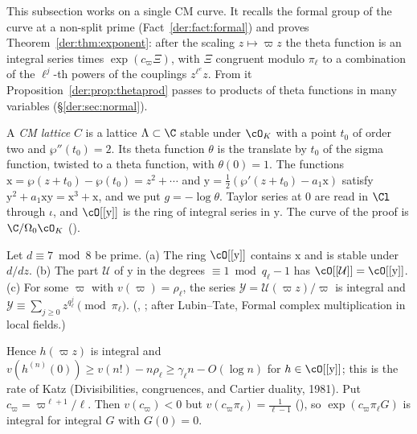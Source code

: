 This subsection works on a single CM curve. It recalls the formal group of the curve at a
non-split prime (Fact~\ref{der:fact:formal}) and proves Theorem~\ref{der:thm:exponent}: after the
scaling $z\mapsto\varpi z$ the theta function is an integral series times $\exp(c_\varpi\Xi)$, with
$\Xi$ congruent modulo $\pi_\ell$ to a combination of the $\ell^j$-th powers of the couplings
$z^{\ell^e}z$. From it Proposition~\ref{der:prop:thetaprod} passes to products of theta functions
in many variables (\S\ref{der:sec:normal}).

A \emph{CM lattice} $C$ is a lattice $\Lambda\subset\C$ stable under $\cO_K$ with a point $t_0$ of
order two and $\wp''(t_0)=2$. Its theta function $\theta$ is the translate by $t_0$ of the sigma
function, twisted to a theta function, with $\theta(0)=1$. The functions
$\mathrm x=\wp(z+t_0)-\wp(t_0)=z^2+\cdots$ and $\mathrm y=\frac12(\wp'(z+t_0)-a_1\mathrm x)$
satisfy $\mathrm y^2+a_1\mathrm x\mathrm y=\mathrm x^3+\mathrm x$, and we put $g=-\log\theta$.
Taylor series at $0$ are read in $\Cl$ through $\iota$, and $\cO[[\mathrm y]]$ is the ring of
integral series in $\mathrm y$. The curve of the proof is $\C/\Omega_0\cO_K$
().

\begin{fact}\label{der:fact:formal}
Let $d\equiv7\bmod8$ be prime. (a) The ring $\cO[[\mathrm y]]$ contains $\mathrm x$ and is stable
under $d/dz$. (b) The part $\mathcal U$ of $\mathrm y$ in the degrees $\equiv1\bmod q_\ell-1$ has
$\cO[[\mathcal U]]=\cO[[\mathrm y]]$. (c) For some $\varpi$ with $v(\varpi)=\rho_\ell$, the series
$\mathcal Y=\mathcal U(\varpi z)/\varpi$ is integral and
$\mathcal Y\equiv\sum_{j\ge0}z^{q_\ell^j}\pmod{\pi_\ell}$.
(, ;
after Lubin--Tate, Formal complex multiplication in local fields.)
\end{fact}

Hence $h(\varpi z)$ is integral and $v(h^{(n)}(0))\ge v(n!)-n\rho_\ell\ge\gamma_\ell n-O(\log n)$
for $h\in\cO[[\mathrm y]]$; this is the rate of Katz (Divisibilities, congruences, and Cartier
duality, 1981). Put $c_\varpi=\varpi^{\ell+1}/\ell$. Then $v(c_\varpi)<0$ but
$v(c_\varpi\pi_\ell)=\frac1{\ell-1}$ (), so
$\exp(c_\varpi\pi_\ell G)$ is integral for integral $G$ with $G(0)=0$.

